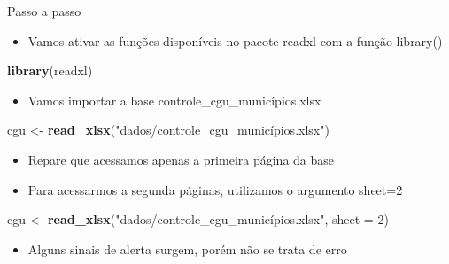 \documentclass[
  10pt,
  ignorenonframetext,
]{beamer}
\newenvironment{Shaded}{\begin{snugshade}}{\end{snugshade}}
\newcommand{\DataTypeTok}[1]{\textcolor[rgb]{0.13,0.29,0.53}{#1}}
\newcommand{\DecValTok}[1]{\textcolor[rgb]{0.00,0.00,0.81}{#1}}
\newcommand{\KeywordTok}[1]{\textcolor[rgb]{0.13,0.29,0.53}{\textbf{#1}}}
\newcommand{\NormalTok}[1]{#1}
\newcommand{\StringTok}[1]{\textcolor[rgb]{0.31,0.60,0.02}{#1}}
\providecommand{\tightlist}{%
  \setlength{\itemsep}{0pt}\setlength{\parskip}{0pt}}
\begin{document}
\begin{frame}[fragile]{Passo a passo}
\protect\hypertarget{passo-a-passo-3}{}
\begin{itemize}
\tightlist
\item
  Vamos ativar as funções disponíveis no pacote readxl com a função
  library()
\end{itemize}

\begin{Shaded}
\begin{Highlighting}[]
\KeywordTok{library}\NormalTok{(readxl)}
\end{Highlighting}
\end{Shaded}

\begin{itemize}
\tightlist
\item
  Vamos importar a base controle\_cgu\_municípios.xlsx
\end{itemize}

\begin{Shaded}
\begin{Highlighting}[]
\NormalTok{cgu \textless{}{-}}\StringTok{ }
\KeywordTok{read\_xlsx}\NormalTok{(}\StringTok{"dados/controle\_cgu\_municípios.xlsx"}\NormalTok{)}
\end{Highlighting}
\end{Shaded}

\begin{itemize}
\tightlist
\item
  Repare que acessamos apenas a primeira página da base
\item
  Para acessarmos a segunda páginas, utilizamos o argumento sheet=2
\end{itemize}

\begin{Shaded}
\begin{Highlighting}[]
\NormalTok{cgu \textless{}{-}}\StringTok{ }
\KeywordTok{read\_xlsx}\NormalTok{(}\StringTok{"dados/controle\_cgu\_municípios.xlsx"}\NormalTok{, }
\DataTypeTok{sheet =} \DecValTok{2}\NormalTok{)}
\end{Highlighting}
\end{Shaded}

\begin{itemize}
\tightlist
\item
  Alguns sinais de alerta surgem, porém não se trata de erro
\end{itemize}
\end{frame}
\end{document}
